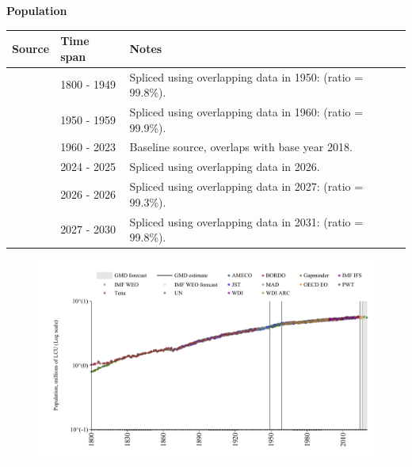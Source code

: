 \documentclass[12pt,a4paper,landscape]{article}
\begin{document}
\begin{adjustbox}{max totalsize={\paperwidth}{\paperheight},center}
\begin{minipage}[t][\textheight][t]{\textwidth}
\vspace*{0.5cm}
{}
\begin{center}
{\Large\bfseries Population}
\end{center}
\vspace{0.5cm}
\begin{table}[H]
\centering
\small
\begin{tabular}{|l|l|l|}
\hline
\textbf{Source} & \textbf{Time span} & \textbf{Notes} \\
\hline
\rowcolor{white}\cite{Gapminder}& 1800 - 1949 &Spliced using overlapping data in 1950: (ratio = 99.8\%). \\
\rowcolor{lightgray}\cite{IMF_IFS}& 1950 - 1959 &Spliced using overlapping data in 1960: (ratio = 99.9\%). \\
\rowcolor{white}\cite{WDI}& 1960 - 2023 &Baseline source, overlaps with base year 2018. \\
\rowcolor{lightgray}\cite{OECD_EO}& 2024 - 2025 &Spliced using overlapping data in 2026. \\
\rowcolor{white}\cite{AMECO}& 2026 - 2026 &Spliced using overlapping data in 2027: (ratio = 99.3\%). \\
\rowcolor{lightgray}\cite{Gapminder}& 2027 - 2030 &Spliced using overlapping data in 2031: (ratio = 99.8\%). \\
\hline
\end{tabular}
\end{table}
\begin{figure}[H]
\centering
\includegraphics[width=\textwidth,height=0.6\textheight,keepaspectratio]{graphs/FIN_pop.pdf}
\end{figure}
\end{minipage}
\end{adjustbox}
\end{document}
